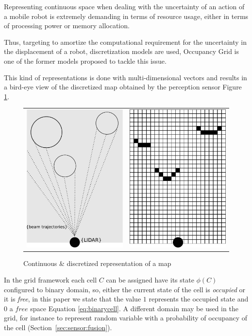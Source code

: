 Representing continuous space when dealing with the uncertainty of an action of a mobile robot is extremely demanding in terms of resource usage, either in terms of processing power or memory allocation.

Thus, targeting to amortize the computational requirement for the uncertainty in the displacement of a robot, discretization models are used, Occupancy Grid\cite{Elfes:1989:UOG:68491.68495} is one of the former models proposed to tackle this issue.

This kind of representations is done with multi-dimensional vectors and results in a bird-eye view of the discretized map obtained by the perception sensor Figure \ref{fig:grid:continuous:discretized}.

\begin{figure}[h]
\centering
	\begin{tabular}{lr}\\
		\includegraphics[width=0.25\columnwidth]{img/fig:motion:impactpoint:01} & %
		\includegraphics[width=0.25\columnwidth]{img/fig:motion:impactpoint:02} %
	\end{tabular}
	\caption{Continuous \& discretized representation of a map}
	\label{fig:grid:continuous:discretized}
\end{figure}

In the grid framework each cell $C$ can be assigned have its state $\phi(C)$ configured to binary domain, so, either the current state of the cell is \textit{occupied} or it is \textit{free}, in this paper we state that the value $1$ represents the occupied state and $0$ a $free$ space Equation \ref{eq:binarycell}. A different domain may be used in the grid, for instance to represent random variable with a probability of occupancy of the cell (Section~\ref{sec:sensor:fusion}).

